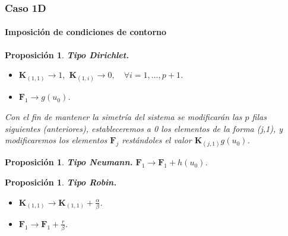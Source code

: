 \documentclass[compress]{beamer}
\newtheorem{proposition}[theorem]{Proposición}
\begin{document}
\begin{frame}
	\frametitle{Caso 1D}
	\framesubtitle{Imposición de condiciones de contorno}
	\scriptsize
	\begin{proposition} \textbf{Tipo Dirichlet.}
		\begin{itemize}
			\item $\mathbf{K}_{(1,1)} \rightarrow 1,$ $\mathbf{K}_{(1,i)} \rightarrow 0,\quad \forall i = 1, ... , p+1$.
			\item $\mathbf{F}_1 \rightarrow g(u_0)$.
		\end{itemize}
		Con el fin de mantener la simetría del sistema se modificarán las $p$ filas siguientes (anteriores), estableceremos a 0 los elementos de la forma (j,1), y modificaremos los elementos $\mathbf{F}_j$ restándoles el valor $\mathbf{K}_{(j,1)}g(u_0)$.
	\end{proposition}

	\begin{proposition} \textbf{Tipo Neumann.}
		$\mathbf{F}_1\rightarrow \mathbf{F}_1+h(u_0)$.
	\end{proposition}

	\begin{proposition} \textbf{Tipo Robin.}
		\begin{itemize}
			\item $\mathbf{K}_{(1,1)}\rightarrow \mathbf{K}_{(1,1)} + \frac{\alpha}{\beta}$. 
			\item $\mathbf{F}_1 \rightarrow \mathbf{F}_1 + \frac{r}{\beta}$.
		\end{itemize}
	\end{proposition}

\end{frame}

\end{document}
